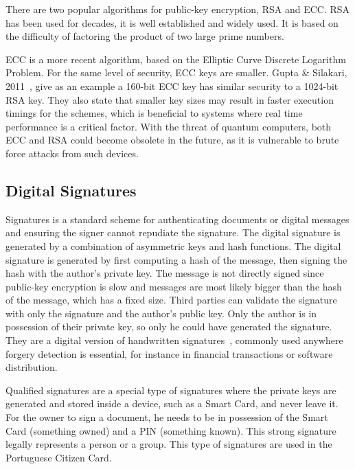 There are two popular algorithms for public-key encryption, \ac{RSA} and \ac{ECC}.
\ac{RSA} has been used for decades, it is well established and widely used. It is based on the difficulty of factoring the product of two large prime numbers.

\ac{ECC} is a more recent algorithm, based on the Elliptic Curve Discrete Logarithm Problem. For the same level of security, \ac{ECC} keys are smaller. Gupta \& Silakari, 2011~\cite{eccoverrsa}, give as an example a 160-bit \ac{ECC} key has similar security to a 1024-bit \ac{RSA} key. They also state that smaller key sizes may result in faster execution timings for the schemes, which is beneficial to systems where real time performance is a critical factor.
With the threat of quantum computers, both \ac{ECC} and \ac{RSA} could become obsolete in the future, as it is vulnerable to brute force attacks from such devices.

\subsection{Digital Signatures}\label{chap:background:crypto:signatures}

Signatures is a standard scheme for authenticating documents or digital messages and ensuring the signer cannot repudiate the signature. The digital signature is generated by a combination of asymmetric keys and hash functions.
The digital signature is generated by first computing a hash of the message, then signing the hash with the author's private key. The message is not directly signed since public-key encryption is slow and messages are most likely bigger than the hash of the message, which has a fixed size. Third parties can validate the signature with only the signature and the author's public key. Only the author is in possession of their private key, so only he could have generated the signature.
They are a digital version of handwritten signatures~\cite{digitalsignatures}, commonly used anywhere forgery detection is essential, for instance in financial transactions or software distribution.

Qualified signatures are a special type of signatures where the private keys are generated and stored inside a device, such as a Smart Card, and never leave it. For the owner to sign a document, he needs to be in possession of the Smart Card (something owned) and a \ac{PIN} (something known). This strong signature legally represents a person or a group. This type of signatures are used in the Portuguese Citizen Card.

